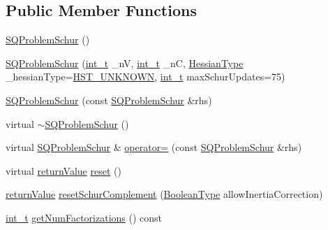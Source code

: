 \subsection*{Public Member Functions}
\begin{DoxyCompactItemize}
\item 
\hyperlink{class_s_q_problem_schur_af90b7e84688b01f9e7eafb1b442ce8da}{S\+Q\+Problem\+Schur} ()
\item 
\hyperlink{class_s_q_problem_schur_af9e29aabfa450e256b3e67fb8b441b3d}{S\+Q\+Problem\+Schur} (\hyperlink{_types_8hpp_ab6fd6105e64ed14a0c9281326f05e623}{int\+\_\+t} \+\_\+nV, \hyperlink{_types_8hpp_ab6fd6105e64ed14a0c9281326f05e623}{int\+\_\+t} \+\_\+nC, \hyperlink{_types_8hpp_a604cad5cda14e378ce4a77ab28ee9fd9}{Hessian\+Type} \+\_\+hessian\+Type=\hyperlink{_types_8hpp_a604cad5cda14e378ce4a77ab28ee9fd9a3479cf4e632ae731d4da9bf57a9f8907}{H\+S\+T\+\_\+\+U\+N\+K\+N\+O\+WN}, \hyperlink{_types_8hpp_ab6fd6105e64ed14a0c9281326f05e623}{int\+\_\+t} max\+Schur\+Updates=75)
\item 
\hyperlink{class_s_q_problem_schur_a6af85b9a6dc33a38678abf3c3ab870a3}{S\+Q\+Problem\+Schur} (const \hyperlink{class_s_q_problem_schur}{S\+Q\+Problem\+Schur} \&rhs)
\item 
virtual \hyperlink{class_s_q_problem_schur_aa64c49771657ad480c4a9a98bfadb2b2}{$\sim$\+S\+Q\+Problem\+Schur} ()
\item 
virtual \hyperlink{class_s_q_problem_schur}{S\+Q\+Problem\+Schur} \& \hyperlink{class_s_q_problem_schur_a241c620b1197e6e0a08a24a8d25c5cdb}{operator=} (const \hyperlink{class_s_q_problem_schur}{S\+Q\+Problem\+Schur} \&rhs)
\item 
virtual \hyperlink{_message_handling_8hpp_a81d556f613bfbabd0b1f9488c0fa865e}{return\+Value} \hyperlink{class_s_q_problem_schur_afe4cfa0c10427b11515ec5a96f883284}{reset} ()
\item 
\hyperlink{_message_handling_8hpp_a81d556f613bfbabd0b1f9488c0fa865e}{return\+Value} \hyperlink{class_s_q_problem_schur_a8b069afa2180ce1bacb47246b1154b05}{reset\+Schur\+Complement} (\hyperlink{_types_8hpp_a20f82124c82b6f5686a7fce454ef9089}{Boolean\+Type} allow\+Inertia\+Correction)
\item 
\hyperlink{_types_8hpp_ab6fd6105e64ed14a0c9281326f05e623}{int\+\_\+t} \hyperlink{class_s_q_problem_schur_a886784fda2dbe387b7fba5bf871a2994}{get\+Num\+Factorizations} () const
\end{DoxyCompactItemize}
